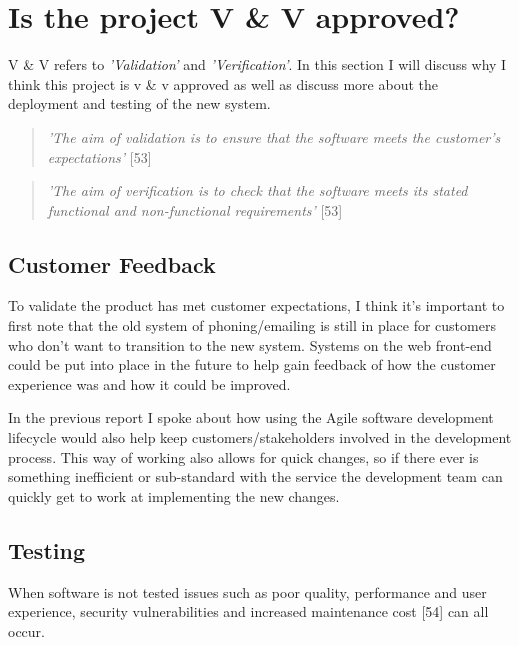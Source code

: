\section{Is the project V \& V approved?}
  V \& V refers to \textit{'Validation'} and \textit{'Verification'}. In this section I will discuss why I think this project is v \&
  v approved as well as discuss more about the deployment and testing of the new system.

  \begin{quote}
    \textit{'The aim of validation is to ensure that the software meets the customer's expectations'} [53]
  \end{quote}

  \begin{quote}
    \textit{'The aim of verification is to check that the software meets its stated functional and non-functional requirements'} [53]
  \end{quote}


  \subsection{Customer Feedback}
  To validate the product has met customer expectations, I think it's important to first note that the old system of phoning/emailing is still in 
  place for customers who don't want to transition to the new system. Systems on the web front-end could be put into place in the future to help 
  gain feedback of how the customer experience was and how it could be improved.

  In the previous report I spoke about how using the Agile software development lifecycle would also help keep customers/stakeholders involved in the 
  development process. This way of working also allows for quick changes, so if there ever is something inefficient or sub-standard with the service the 
  development team can quickly get to work at implementing the new changes.
  
  \subsection{Testing}
  \label{sec:Testing}

  When software is not tested issues such as poor quality, performance and user experience, security vulnerabilities and increased maintenance cost [54]
  can all occur.

